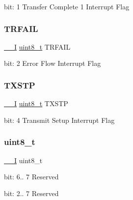 bit\+: 1 Transfer Complete 1 Interrupt Flag \mbox{\label{union_u_s_b___h_o_s_t___p_i_n_t_f_l_a_g___type_aa3e11ee6462bfc034721044e1fb311f0}} 
\subsubsection{\texorpdfstring{TRFAIL}{TRFAIL}}
{\footnotesize\ttfamily \mbox{\hyperlink{core__cm0plus_8h_af63697ed9952cc71e1225efe205f6cd3}{\+\_\+\+\_\+I}} \mbox{\hyperlink{union_u_s_b___h_o_s_t___p_i_n_t_f_l_a_g___type_a5b4208c6f4c4a4290c4f2804d1eb1d5b}{uint8\+\_\+t}} T\+R\+F\+A\+IL}

bit\+: 2 Error Flow Interrupt Flag \mbox{\label{union_u_s_b___h_o_s_t___p_i_n_t_f_l_a_g___type_ad7b5bb61a232d52e858752038efc23d7}} 
\subsubsection{\texorpdfstring{TXSTP}{TXSTP}}
{\footnotesize\ttfamily \mbox{\hyperlink{core__cm0plus_8h_af63697ed9952cc71e1225efe205f6cd3}{\+\_\+\+\_\+I}} \mbox{\hyperlink{union_u_s_b___h_o_s_t___p_i_n_t_f_l_a_g___type_a5b4208c6f4c4a4290c4f2804d1eb1d5b}{uint8\+\_\+t}} T\+X\+S\+TP}

bit\+: 4 Transmit Setup Interrupt Flag \mbox{\label{union_u_s_b___h_o_s_t___p_i_n_t_f_l_a_g___type_a5b4208c6f4c4a4290c4f2804d1eb1d5b}} 
\subsubsection{\texorpdfstring{uint8\_t}{uint8\_t}}
{\footnotesize\ttfamily \mbox{\hyperlink{core__cm0plus_8h_af63697ed9952cc71e1225efe205f6cd3}{\+\_\+\+\_\+I}} uint8\+\_\+t}

bit\+: 6.. 7 Reserved

bit\+: 2.. 7 Reserved \mbox{\label{union_u_s_b___h_o_s_t___p_i_n_t_f_l_a_g___type_a3cd86de0838fb16216c0ad90988c8e0a}} 
